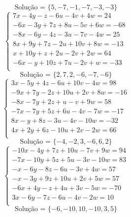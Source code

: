 \documentclass[12pt,oneside,a4paper]{article}
\begin{document}
\begin{equation*}
\text{Solução = }\{5,-7,-1,-7,-3,-3\}
\end{equation*}
\vspace{\baselineskip}
\begin{equation*}
\begin{cases}
7x-4y-z-6u-4v+4w=24 \\
-6x-3y+7z+8u-5v+6w=-68 \\
-8x-6y-4z-3u-7v-4w=25 \\
8x+9y+7z-2u+10v+8w=-13 \\
x+10y+z+2u-2v+2w=64 \\
-6x-y+10z+7u-2v+w=-33 \\
\end{cases}
\end{equation*}
\begin{equation*}
\text{Solução = }\{2,7,2,-6,-7,-6\}
\end{equation*}
\vspace{\baselineskip}
\begin{equation*}
\begin{cases}
3x-5y+4z-6u+10v-4w=98 \\
-9x+7y-2z+10u+2v+8w=-16 \\
-8x-7y+2z+u-v+9w=58 \\
-7x-7y+5z+6u-4v-7w=-17 \\
8x-y+8z-3u-4v-10w=-32 \\
4x+2y+6z-10u+2v-2w=66 \\
\end{cases}
\end{equation*}
\begin{equation*}
\text{Solução = }\{-4,-2,3,-6,6,2\}
\end{equation*}
\vspace{\baselineskip}
\begin{equation*}
\begin{cases}
-10x-4y+7z+10u-7v+9w=94 \\
-7x-10y+5z+5u-3v-10w=83 \\
-x-6y-8z-6u-3v+4w=57 \\
-x-3y+9z+10u+2v+5w=57 \\
-6x+4y-z+4u+3v-5w=-70 \\
3x-6y-7z-6u-4v-2w=10 \\
\end{cases}
\end{equation*}
\begin{equation*}
\text{Solução = }\{-6,-10,10,-10,3,5\}
\end{equation*}
\end{document}
